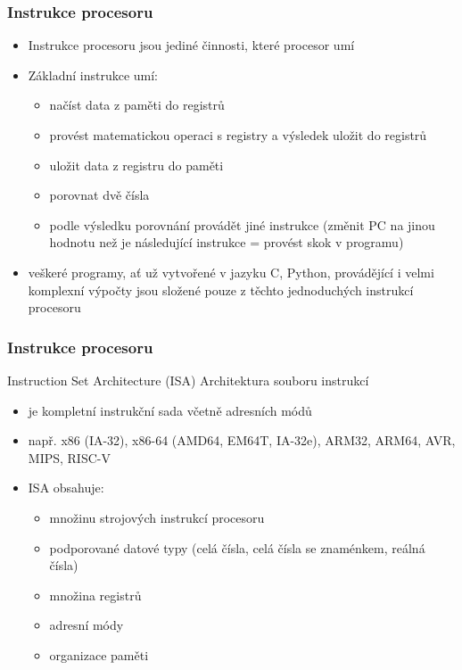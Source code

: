 \documentclass{beamer}
\begin{document}
\begin{frame}
\frametitle{Instrukce procesoru}

\begin{itemize}
\item Instrukce procesoru jsou jediné činnosti, které procesor umí
\item Základní instrukce umí:
\begin{itemize}
\item načíst data z paměti do registrů
\item provést matematickou operaci s registry a výsledek uložit do registrů
\item uložit data z registru do paměti
\item porovnat dvě čísla
\item podle výsledku porovnání provádět jiné instrukce (změnit PC na jinou hodnotu než je následující instrukce = provést skok v programu)
\end{itemize}
\item veškeré programy, ať už vytvořené v jazyku C, Python, provádějící i velmi komplexní výpočty jsou složené pouze z těchto jednoduchých instrukcí procesoru
\end{itemize}

\end{frame}

\begin{frame}
\frametitle{Instrukce procesoru}

Instruction Set Architecture (ISA) Architektura souboru instrukcí
\begin{itemize}
\item je kompletní instrukční sada včetně adresních módů
\item např. x86 (IA-32), x86-64 (AMD64, EM64T, IA-32e), ARM32, ARM64, AVR, MIPS, RISC-V
\item ISA obsahuje:
\begin{itemize}
\item množinu strojových instrukcí procesoru
\item podporované datové typy (celá čísla, celá čísla se znaménkem, reálná čísla)
\item množina registrů
\item adresní módy
\item organizace paměti
\end{itemize}
\end{itemize}

\end{frame}
\end{document}
